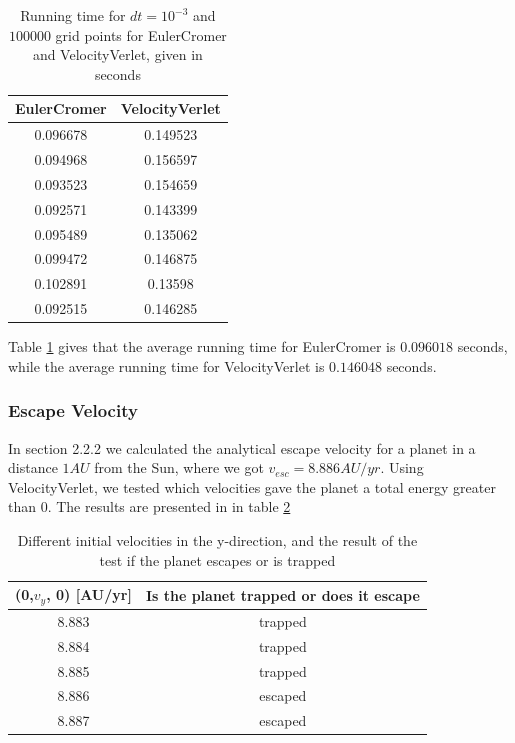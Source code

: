 \documentclass[norsk,a4paper,12pt]{article}
\begin{document}
{\begin{table} [H]
\caption{Running time for $dt=10^{-3}$ and $100000$ grid points for EulerCromer and VelocityVerlet, given in seconds}
\begin{tabular}{|c|c|} \hline
    \bf EulerCromer & \bf VelocityVerlet \\ \hline
    0.096678 & 0.149523\\ \hline
    0.094968 & 0.156597\\ \hline
    0.093523 & 0.154659\\ \hline
    0.092571 & 0.143399\\ \hline
    0.095489 & 0.135062\\ \hline
    0.099472 & 0.146875\\ \hline
    0.102891 & 0.13598\\ \hline
    0.092515 & 0.146285\\ \hline
\end{tabular}
\label{timeTable}
\end{table}

Table \ref{timeTable} gives that the average running time for EulerCromer is $0.096018$ seconds, while the average running time for VelocityVerlet is $0.146048$ seconds.

\subsubsection{Escape Velocity}
In section 2.2.2 we calculated the analytical escape velocity for a planet in a distance $1 AU$ from the Sun, where we got $v_{esc} = 8.886 AU/yr$. Using VelocityVerlet, we tested which velocities gave the planet a total energy greater than 0. The results are presented in in table \ref{trappedTable}

\begin{table} [H]
\caption{Different initial velocities in the y-direction, and the result of the test if the planet escapes or is trapped}
\begin{tabular}{|c|c|} \hline
    (0,$v_y$, 0) [AU/yr] & \bf Is the planet trapped or does it escape \\ \hline
    8.883 & trapped \\ \hline
    8.884 & trapped \\ \hline
    8.885 & trapped \\ \hline
    8.886 & escaped \\ \hline
    8.887 & escaped \\ \hline
\end{tabular}
\label{trappedTable}
\end{table}
}
\end{document}
